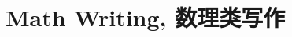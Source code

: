     \section{Math Writing, 数理类写作}
        \lipsum[1-2]
        \begin{definition}
            
        \end{definition}
        \lipsum[3-4]
        \begin{lemma}[]
            
        \end{lemma}